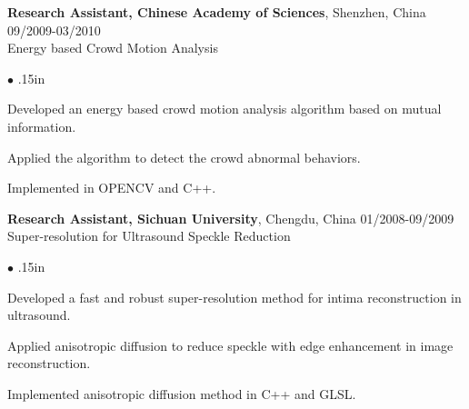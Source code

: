 \documentclass[line,margin]{res}
\newenvironment{bullets}{\begin{list}{\tiny$\bullet$}{\topsep 0pt \itemsep -2pt \leftmargin .15in}}{\vspace*{4pt}\end{list}}
\begin{document}
\begin{resume}
\textbf{Research Assistant, Chinese Academy of Sciences}, Shenzhen, China   \hfill      09/2009-03/2010 \\ %
Energy based Crowd Motion Analysis
\begin{bullets}
\item Developed an energy based crowd motion analysis algorithm based on mutual information.
\item Applied the algorithm to detect the crowd abnormal behaviors.
\item Implemented in OPENCV and C++.
\end{bullets}
\vspace{-.1in}

\textbf{Research Assistant, Sichuan University}, Chengdu, China \hfill      01/2008-09/2009 \\%
Super-resolution for Ultrasound Speckle Reduction
\begin{bullets}
\item Developed a fast and robust super-resolution method for intima reconstruction in
ultrasound. 
\item Applied anisotropic diffusion to reduce speckle with edge enhancement in image reconstruction.
\item Implemented anisotropic diffusion method in C++ and GLSL.
\end{bullets} %


\end{resume}
\end{document}
